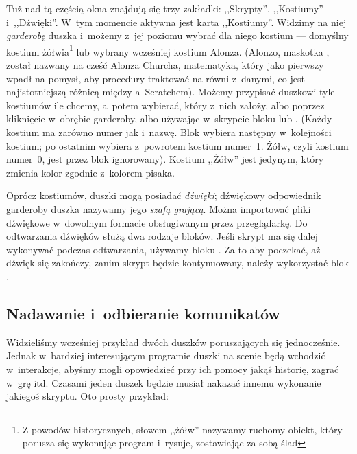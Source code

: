 \documentclass[a4paper]{report}
\begin{document}
Tuż nad tą częścią okna znajdują się trzy zakładki: ,,Skrypty'', ,,Kostiumy'' i~,,Dźwię\-ki''. W~tym momencie aktywna jest karta ,,Kostiumy''. Widzimy na niej \emph{garderobę} duszka i~możemy z~jej poziomu wybrać dla niego kostium --- domyślny kostium żółwia\footnote{Z powodów historycznych, słowem ,,żółw'' nazywamy ruchomy obiekt, który porusza się wykonując program i~rysuje, zostawiając za sobą ślad} lub wybrany wcześniej kostium Alonza. (Alonzo, maskotka , został nazwany na cześć Alonza Churcha, matematyka, który jako pierwszy wpadł na pomysł, aby procedury traktować na równi z~danymi, co jest najistotniejszą różnicą między  a~Scratchem). Możemy przypisać duszkowi tyle kostiumów ile chcemy, a~potem wybierać, który z~nich założy, albo poprzez kliknięcie w~obrębie garderoby, albo używając w~skrypcie bloku  lub . (Każdy kostium ma zarówno numer jak i~nazwę. Blok  wybiera następny w~kolejności kostium; po ostatnim wybiera z~powrotem kostium numer~1. Żółw, czyli kostium numer~0, jest przez blok  ignorowany). Kostium ,,Żółw'' jest jedynym, który zmienia kolor zgodnie z~kolorem pisaka.

Oprócz kostiumów, duszki mogą posiadać \emph{dźwięki}; dźwiękowy odpowiednik garderoby duszka nazywamy jego \emph{szafą grającą}. Można importować pliki dźwiękowe w~dowolnym formacie obsługiwanym przez przeglądarkę. Do odtwarzania dźwięków służą dwa rodzaje bloków. Jeśli skrypt ma się dalej wykonywać podczas odtwarzania, używamy bloku . Za to aby poczekać, aż dźwięk się zakończy, zanim skrypt będzie kontynuowany, należy wykorzystać blok .

\subsection{Nadawanie i~odbieranie komunikatów}

Widzieliśmy wcześniej przykład dwóch duszków poruszających się jednocześnie. Jednak w~bardziej interesującym programie duszki na scenie będą wchodzić w~interakcje, abyśmy mogli opowiedzieć przy ich pomocy jakąś historię, zagrać w~grę itd. Czasami jeden duszek będzie musiał nakazać innemu wykonanie jakiegoś skryptu. Oto prosty przykład:\nopagebreak
\end{document}
